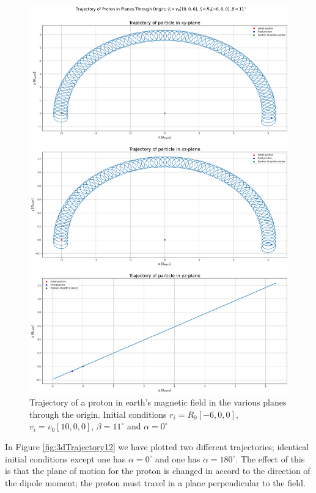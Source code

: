 \begin{figure}[H]
    \centering
    \includegraphics[scale=.20]{Images/trajectoryPlanes1.png}
    \caption{Trajectory of a proton in earth's magnetic field in the various planes through the origin. Initial conditions $r_i=R_0[-6,0,0]$, $v_i=v_0[10,0,0]$, $\beta=11^{\circ}$ and $\alpha=0^{\circ}$}
    \label{fig:planeTrajectory1}
\end{figure}

In Figure \ref{fig:3dTrajectory12} we have plotted two different trajectories; identical initial conditions except one has $\alpha=0^{\circ}$ and one has $\alpha=180^{\circ}$. The effect of this is that the plane of motion for the proton is changed in accord to the direction of the dipole moment; the proton must travel in a plane perpendicular to the field.

